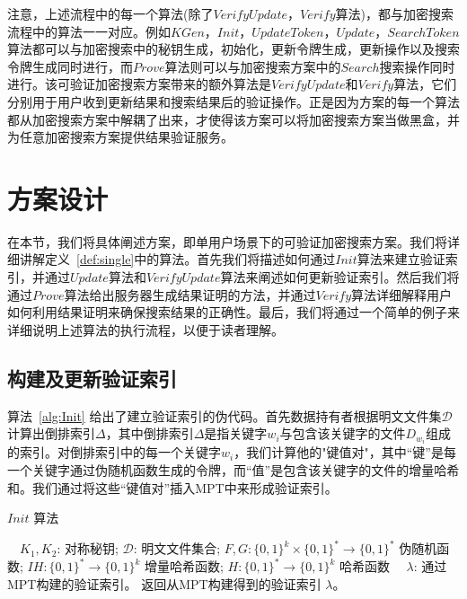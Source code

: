注意，上述流程中的每一个算法(除了$VerifyUpdate$，$Verify$算法)，都与加密搜索流程中的算法一一对应。例如$KGen$，$Init$，$UpdateToken$，$Update$，$SearchToken$算法都可以与加密搜索中的秘钥生成，初始化，更新令牌生成，更新操作以及搜索令牌生成同时进行，而$Prove$算法则可以与加密搜索方案中的$Search$搜索操作同时进行。该可验证加密搜索方案带来的额外算法是$VerifyUpdate$和$Verify$算法，它们分别用于用户收到更新结果和搜索结果后的验证操作。正是因为\single 方案的每一个算法都从加密搜索方案中解耦了出来，才使得该方案可以将加密搜索方案当做黑盒，并为任意加密搜索方案提供结果验证服务。

\section{方案设计}
在本节，我们将具体阐述\single 方案，即单用户场景下的可验证加密搜索方案。我们将详细讲解定义~\ref{def:single}中的算法。首先我们将描述如何通过$Init$算法来建立验证索引，并通过$Update$算法和$VerifyUpdate$算法来阐述如何更新验证索引。然后我们将通过$Prove$算法给出服务器生成结果证明的方法，并通过$Verify$算法详细解释用户如何利用结果证明来确保搜索结果的正确性。最后，我们将通过一个简单的例子来详细说明上述算法的执行流程，以便于读者理解。

\subsection{构建及更新验证索引}

算法~\ref{alg:Init} 给出了建立验证索引的伪代码。首先数据持有者根据明文文件集$\mathcal{D}$计算出倒排索引$\Delta$，其中倒排索引$\Delta$是指关键字$w_i$与包含该关键字的文件$D_{w_i}$组成的索引。对倒排索引中的每一个关键字$w_i$，我们计算他的"键值对"，其中“键”是每一个关键字通过伪随机函数生成的令牌，而“值”是包含该关键字的文件的增量哈希和。我们通过将这些“键值对”插入MPT中来形成验证索引。
\begin{algorithm}[ht]
  \caption{$Init$ 算法}
  \label{alg:Init}
  \begin{algorithmic}[1]
    \REQUIRE ~~{$K_1,K_2$: 对称秘钥; $\mathcal{D}$: 明文文件集合;  $F, G: \{0, 1\}^k \times \{0, 1\}^* \rightarrow \{0, 1\}^*$ 伪随机函数; $IH: \{0, 1\}^* \rightarrow \{0, 1\}^k$ 增量哈希函数; $H: \{0, 1\}^* \rightarrow \{0, 1\}^k$ 哈希函数}
    \ENSURE ~~{$\lambda$: 通过MPT构建的验证索引。}
              \ENDFOR
              \RETURN 返回从MPT构建得到的验证索引 $\lambda$。
  \end{algorithmic}
\end{algorithm}


